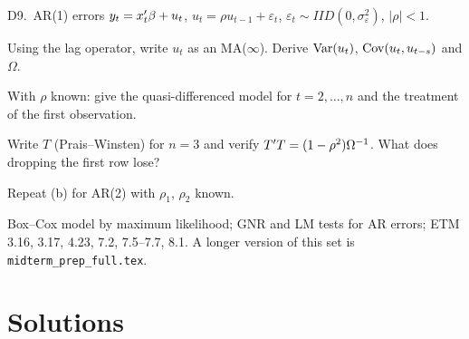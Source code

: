 \documentclass[11pt]{article}
\newcommand{\newtag}{\tcbox[on line, colback=qnavy!60, colframe=qnavy!60, coltext=white,
  boxsep=1pt, left=3pt, right=3pt, top=0pt, bottom=0pt, arc=1.5pt]{\scriptsize\sffamily\bfseries NEW}}
\begin{document}
\begin{qbox}{D9.\ AR(1) errors}{\newtag}
$y_{t} = x_{t}^{\prime}\beta + u_{t}$, $u_{t} = \rho u_{t-1} + \varepsilon_{t}$,
$\varepsilon_{t} \sim IID(0,\sigma_{\varepsilon}^{2})$, $|\rho| < 1$.
\begin{flatlist}
  \item[(a)] Using the lag operator, write $u_{t}$ as an MA($\infty$). Derive $\operatorname{Var}(u_{t})$,
        $\operatorname{Cov}(u_{t},u_{t-s})$ and $\Omega$.
  \item[(b)] With $\rho$ known: give the quasi-differenced model for $t = 2,\dots,n$ and the
        treatment of the first observation.
  \item[(c)] Write $T$ (Prais--Winsten) for $n = 3$ and verify $T^{\prime} T = (1-\rho^{2})\Omega^{-1}$.
        What does dropping the first row lose?
  \item[(d)] Repeat (b) for AR(2) with $\rho_{1}$, $\rho_{2}$ known.
\end{flatlist}
\end{qbox}

{\small Box--Cox model by maximum likelihood; GNR and LM tests for AR errors; ETM 3.16,
3.17, 4.23, 7.2, 7.5--7.7, 8.1. A longer version of this set is
\texttt{midterm\_prep\_full.tex}.}

\clearpage
\section{Solutions}\label{sec:solutions}
\end{document}
